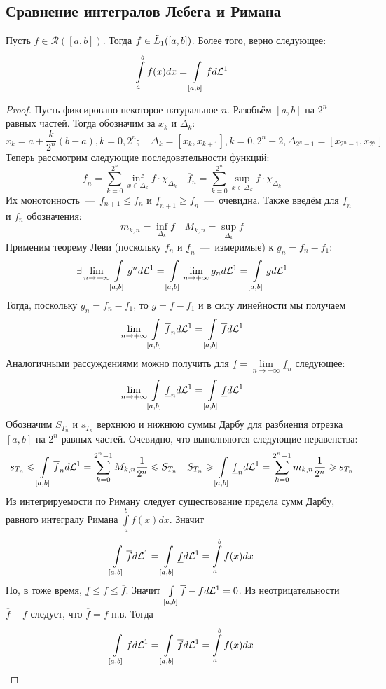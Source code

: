 \subsection{Сравнение интегралов Лебега и Римана}
\begin{theorem}
    Пусть $f \in \mathcal{R}([a, b])$. Тогда $f \in \Tilde{L}_1([a, b])$. Более того, верно следующее: \[ \int\limits_a^b f(x)dx = \int\limits_{[a, b]}fd\mathcal{L}^1\]
\end{theorem}
\begin{proof}
    Пусть фиксировано некоторое натуральное $n$. Разобьём $[a, b]$ на $2^n$ равных частей. Тогда обозначим за $x_k$ и $\Delta_k$: \[x_k = a + \dfrac{k}{2^n}(b - a), k = \overline{0, 2^n}; \quad \Delta_k = [x_k, x_{k + 1}], k = \overline{0, 2^n - 2}, \Delta_{2^n - 1} = [x_{2^n - 1}, x_{2^n}]\] 
    Теперь рассмотрим следующие последовательности функций: \[\underline{f}_n = \sum\limits_{k = 0}^{2^n} \inf\limits_{x \in \Delta_k} f\cdot \chi_{\Delta_k} \quad \overline{f}_n = \sum\limits_{k = 0}^{2^n} \sup\limits_{x \in \Delta_k} f\cdot \chi_{\Delta_k}\]
    Их монотонность~---~$\overline{f}_{n + 1} \leq \overline{f}_n$ и $\underline{f}_{n + 1} \geq \underline{f}_n$~---~очевидна. Также введём для $\underline{f}_n$ и $\overline{f}_n$ обозначения: \[m_{k, n} = \inf\limits_{\Delta_k} f \quad M_{k, n} = \sup\limits_{\Delta_k} f \]
    Применим теорему Леви (поскольку $\overline{f}_n$ и $\underline{f}_n$~---~измеримые) к $g_n = \overline{f}_n - \overline{f}_1$: \[\exists \lim\limits_{n \rightarrow +\infty} \int\limits_{[a, b]}g^nd\mathcal{L}^1 = \int\limits_{[a, b]}\lim\limits_{n \rightarrow +\infty} g_nd\mathcal{L}^1 = \int\limits_{[a, b]}gd\mathcal{L}^1\]
    Тогда, поскольку $g_n = \overline{f}_n - \overline{f}_1$, то $g = \overline{f} - \overline{f}_1$ и в силу линейности мы получаем \[\lim\limits_{n \rightarrow +\infty} \int\limits_{[a, b]} \overline{f}_nd\mathcal{L}^1 = \int\limits_{[a, b]}\overline{f}d\mathcal{L}^1\]
    Аналогичными рассуждениями можно получить для $\underline{f} = \lim\limits_{n \rightarrow +\infty}\underline{f}_n$ следующее: \[\lim\limits_{n \rightarrow +\infty} \int\limits_{[a, b]}\underline{f}_nd\mathcal{L}^1 = \int\limits_{[a, b]}\underline{f}d\mathcal{L}^1\]
    Обозначим $S_{T_n}$ и $s_{T_n}$ верхнюю и нижнюю суммы Дарбу для разбиения отрезка $[a, b]$ на $2^n$ равных частей. Очевидно, что выполняются следующие неравенства: \[s_{T_n} \leqslant \int\limits_{[a, b]}\overline{f}_nd\mathcal{L}^1 = \sum\limits_{k = 0}^{2^n - 1}M_{k, n}\dfrac{1}{2^n} \leqslant S_{T_n} \quad S_{T_n} \geqslant \int\limits_{[a, b]} \underline{f}_n d\mathcal{L}^1 = \sum\limits_{k = 0}^{2^n - 1} m_{k, n}\dfrac{1}{2^n} \geqslant s_{T_n}\]
    Из интегрируемости по Риману следует существование предела сумм Дарбу, равного интегралу Римана $\int\limits_a^b f(x)dx$. Значит \[\int\limits_{[a, b]}\overline{f}d\mathcal{L}^1 = \int\limits_{[a, b]}\underline{f}d\mathcal{L}^1 = \int\limits_a^bf(x)dx\]
    Но, в тоже время, $\underline{f} \leq f \leq \overline{f}$. Значит $\int\limits_{[a, b]}\overline{f} - fd\mathcal{L}^1 = 0$. Из неотрицательности $\overline{f} - f$ следует, что $\overline{f} = f$ п.в. Тогда \[\int\limits_{[a, b]}fd\mathcal{L}^1 = \int\limits_{[a, b]}\overline{f}d\mathcal{L}^1 = \int\limits_a^bf(x)dx\]
\end{proof}
